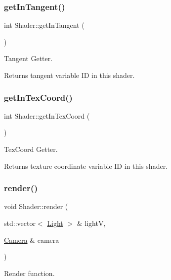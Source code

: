 \subsubsection{\texorpdfstring{get\+In\+Tangent()}{getInTangent()}}
{\footnotesize\ttfamily int Shader\+::get\+In\+Tangent (\begin{DoxyParamCaption}{ }\end{DoxyParamCaption})}



Tangent Getter. 

\begin{DoxyReturn}{Returns}
tangent variable ID in this shader. 
\end{DoxyReturn}
\mbox{\label{class_shader_a386214ac36c08a8405ec458f75d17d12}} 
\subsubsection{\texorpdfstring{get\+In\+Tex\+Coord()}{getInTexCoord()}}
{\footnotesize\ttfamily int Shader\+::get\+In\+Tex\+Coord (\begin{DoxyParamCaption}{ }\end{DoxyParamCaption})}



Tex\+Coord Getter. 

\begin{DoxyReturn}{Returns}
texture coordinate variable ID in this shader. 
\end{DoxyReturn}
\mbox{\label{class_shader_a86da40ddee3a9d49d11a6d9ebd533e4d}} 
\subsubsection{\texorpdfstring{render()}{render()}}
{\footnotesize\ttfamily void Shader\+::render (\begin{DoxyParamCaption}\item[{std\+::vector$<$ \hyperlink{class_light}{Light} $>$ \&}]{lightV,  }\item[{\hyperlink{class_camera}{Camera} \&}]{camera }\end{DoxyParamCaption})}



Render function. 

